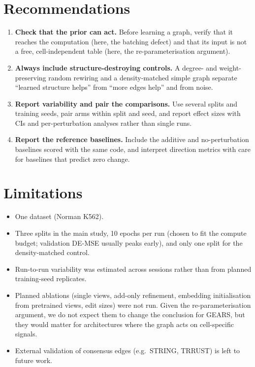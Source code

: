 \documentclass[11pt]{article}
\newcommand{\GEARS}{\textsc{GEARS}}
\begin{document}
\section{Recommendations}
\begin{enumerate}
  \item \textbf{Check that the prior can act.} Before learning a graph, verify that it reaches the computation
        (here, the batching defect) and that its input is not a free, cell-independent table (here, the
        re-parameterisation argument).
  \item \textbf{Always include structure-destroying controls.} A degree- and weight-preserving random rewiring and a
        density-matched simple graph separate ``learned structure helps'' from ``more edges help'' and from noise.
  \item \textbf{Report variability and pair the comparisons.} Use several splits and training seeds, pair arms
        within split and seed, and report effect sizes with CIs and per-perturbation analyses rather than single
        runs.
  \item \textbf{Report the reference baselines.} Include the additive and no-perturbation baselines scored with the
        same code, and interpret direction metrics with care for baselines that predict zero change.
\end{enumerate}

\section{Limitations}
\begin{itemize}
  \item One dataset (Norman K562).
  \item Three splits in the main study, 10 epochs per run (chosen to fit the compute budget; validation DE-MSE
        usually peaks early), and only one split for the density-matched control.
  \item Run-to-run variability was estimated across sessions rather than from planned training-seed replicates.
  \item Planned ablations (single views, add-only refinement, embedding initialisation from pretrained views,
        edit sizes) were not run. Given the re-parameterisation argument, we do not expect them to change the
        conclusion for \GEARS{}, but they would matter for architectures where the graph acts on cell-specific
        signals.
  \item External validation of consensus edges (e.g.\ STRING, TRRUST) is left to future work.
\end{itemize}
\end{document}
